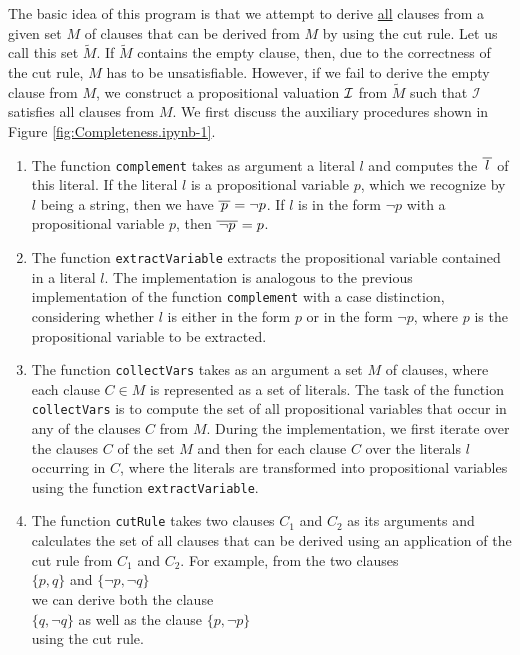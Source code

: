 The basic idea
of this program is that we attempt to derive \underline{all} clauses from a given set $M$ of clauses
that can be derived from $M$ by using the cut rule.  Let us call this set $\widetilde{M}$.  If $\widetilde{M}$ contains the empty clause,
then, due to the correctness of the cut rule, $M$ has to be unsatisfiable. However, if we fail to derive the empty clause from $M$,
we construct a propositional valuation
$\mathcal{I}$ from $\widetilde{M}$ such that $\mathcal{I}$ satisfies all clauses from $M$.
We first discuss the auxiliary procedures shown in Figure \ref{fig:Completeness.ipynb-1}.
\begin{enumerate}
\item The function \texttt{complement} takes as argument a literal $l$ and computes the
       $\overline{\,l\,}$ of this literal.
      If the literal $l$ is a propositional variable $p$, which we recognize by $l$ being a string,
      then we have $\overline{\,p\,} = \neg p$.
      If $l$ is in the form $\neg p$ with a propositional variable $p$, then $\overline{\,\neg p\,} =
      p$.
\item The function \texttt{extractVariable} extracts the propositional variable contained in a literal $l$.
      The implementation is analogous to the previous implementation of the function 
      \texttt{complement} with a case distinction, considering whether $l$ is either in the form
      $p$ or in the form $\neg p$, where $p$ is the propositional variable to be extracted.
\item The function \texttt{collectVars} takes as an argument a set $M$ of clauses, where each
      clause \mbox{$C \!\in\! M$} is represented as a set of literals. The task of the
      function \texttt{collectVars} is to compute the set of all propositional variables
      that occur in any of the clauses $C$ from $M$. During the implementation, we first iterate
      over the clauses $C$ of the set $M$ and then for each clause $C$ over the literals $l$ occurring in $C$,
      where the literals are transformed into propositional variables using the function \texttt{extractVariable}.
\item The function \texttt{cutRule} takes two clauses $C_1$ and $C_2$ as its arguments and calculates
      the set of all clauses that can be derived using an application of the cut rule from $C_1$ and $C_2$.
      For example, from the two clauses
      \\[0.2cm]
      \hspace*{1.3cm}
      $\{ p, q \}$ \quad and \quad $\{ \neg p, \neg q \}$ 
      \\[0.2cm]
      we can derive both the clause
      \\[0.2cm]
      \hspace*{1.3cm}
      $\{q, \neg q\}$ \quad as well as the clause \quad $\{p, \neg p \}$
      \\[0.2cm]
      using the cut rule.
\end{enumerate}

